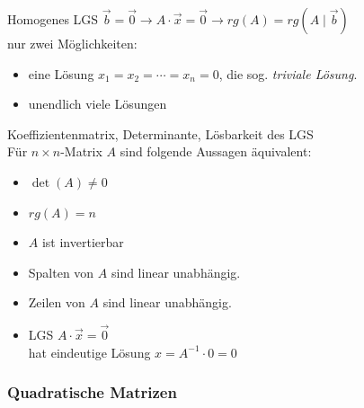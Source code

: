     \begin{definition}{Homogenes LGS}
        $\vec{b}=\vec{0} \rightarrow A\cdot\vec{x}=\vec{0} \rightarrow rg(A)=rg(A\mid\vec{b})$\\
        nur zwei Möglichkeiten:
            \begin{itemize}
                \item eine Lösung $x_1=x_2=\cdots=x_n=0$, die sog. \textit{triviale Lösung}.
                \item unendlich viele Lösungen
            \end{itemize}
    \end{definition}

    \begin{theorem}{Koeffizientenmatrix{,} Determinante{,} Lösbarkeit des LGS }\\
        Für $n\times n$-Matrix $A$ sind folgende Aussagen äquivalent:
    
        \vspace{1mm}
    
        \begin{minipage}{0.3\linewidth}
            \begin{itemize}
                \item $\det(A)\neq 0$
                \item $rg(A)=n$
                \item $A$ ist invertierbar
            \end{itemize}
        \end{minipage}
        \begin{minipage}{0.7\linewidth}
            \begin{itemize}
                \item Spalten von $A$ sind linear unabhängig.
                \item Zeilen von $A$ sind linear unabhängig.
                \item LGS $A\cdot\vec{x}=\vec{0}$ \\hat eindeutige Lösung $x=A^{-1}\cdot 0=0$
            \end{itemize}
        \end{minipage}
    \end{theorem}


  

\subsubsection*{Quadratische Matrizen}



